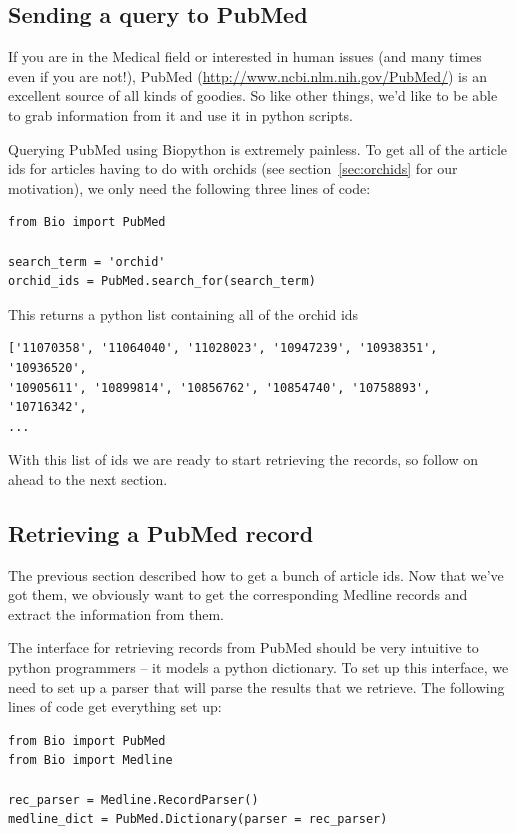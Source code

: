 \documentclass{report}
\begin{document}
\subsection{Sending a query to PubMed}

If you are in the Medical field or interested in human issues (and many times even if you are not!), PubMed (\url{http://www.ncbi.nlm.nih.gov/PubMed/}) is an excellent source of all kinds of goodies. So like other things, we'd like to be able to grab information from it and use it in python scripts.

Querying PubMed using Biopython is extremely painless. To get all of the article ids for articles having to do with orchids (see section~\ref{sec:orchids} for our motivation), we only need the following three lines of code:

\begin{verbatim}
from Bio import PubMed

search_term = 'orchid'
orchid_ids = PubMed.search_for(search_term)
\end{verbatim}

This returns a python list containing all of the orchid ids

\begin{verbatim}
['11070358', '11064040', '11028023', '10947239', '10938351', '10936520',
'10905611', '10899814', '10856762', '10854740', '10758893', '10716342',
...
\end{verbatim}

With this list of ids we are ready to start retrieving the records, so follow on ahead to the next section.

\subsection{Retrieving a PubMed record}

The previous section described how to get a bunch of article ids. Now that we've got them, we obviously want to get the corresponding Medline records and extract the information from them.

The interface for retrieving records from PubMed should be very intuitive to python programmers -- it models a python dictionary. To set up this interface, we need to set up a parser that will parse the results that we retrieve. The following lines of code get everything set up:

\begin{verbatim}
from Bio import PubMed
from Bio import Medline

rec_parser = Medline.RecordParser()
medline_dict = PubMed.Dictionary(parser = rec_parser)
\end{verbatim}
\end{document}
